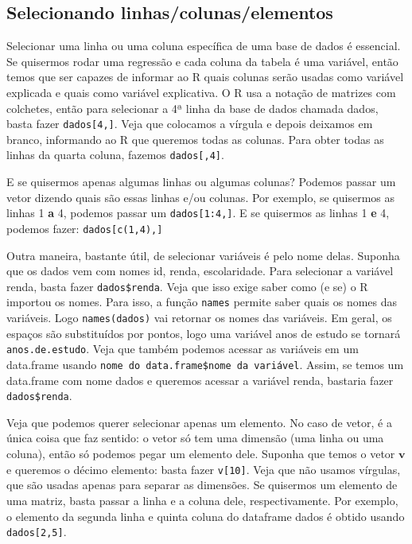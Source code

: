 \documentclass[]{book}
\begin{document}
\subsection{Selecionando
linhas/colunas/elementos}\label{selecionando-linhascolunaselementos}

Selecionar uma linha ou uma coluna específica de uma base de dados é
essencial. Se quisermos rodar uma regressão e cada coluna da tabela é
uma variável, então temos que ser capazes de informar ao R quais colunas
serão usadas como variável explicada e quais como variável explicativa.
O R usa a notação de matrizes com colchetes, então para selecionar a 4ª
linha da base de dados chamada dados, basta fazer
\texttt{dados{[}4,{]}}. Veja que colocamos a vírgula e depois deixamos
em branco, informando ao R que queremos todas as colunas. Para obter
todas as linhas da quarta coluna, fazemos \texttt{dados{[},4{]}}.

E se quisermos apenas algumas linhas ou algumas colunas? Podemos passar
um vetor dizendo quais são essas linhas e/ou colunas. Por exemplo, se
quisermos as linhas 1 \textbf{a} 4, podemos passar um
\texttt{dados{[}1:4,{]}}. E se quisermos as linhas 1 \textbf{e} 4,
podemos fazer: \texttt{dados{[}c(1,4),{]}}

Outra maneira, bastante útil, de selecionar variáveis é pelo nome delas.
Suponha que os dados vem com nomes id, renda, escolaridade. Para
selecionar a variável renda, basta fazer \texttt{dados\$renda}. Veja que
isso exige saber como (e se) o R importou os nomes. Para isso, a função
\texttt{names} permite saber quais os nomes das variáveis. Logo
\texttt{names(dados)} vai retornar os nomes das variáveis. Em geral, os
espaços são substituídos por pontos, logo uma variável anos de estudo se
tornará \texttt{anos.de.estudo}. Veja que também podemos acessar as
variáveis em um data.frame usando
\texttt{nome\ do\ data.frame\$nome\ da\ variável}. Assim, se temos um
data.frame com nome dados e queremos acessar a variável renda, bastaria
fazer \texttt{dados\$renda}.

Veja que podemos querer selecionar apenas um elemento. No caso de vetor,
é a única coisa que faz sentido: o vetor só tem uma dimensão (uma linha
ou uma coluna), então só podemos pegar um elemento dele. Suponha que
temos o vetor \(\mathbf{v}\) e queremos o décimo elemento: basta fazer
\texttt{v{[}10{]}}. Veja que não usamos vírgulas, que são usadas apenas
para separar as dimensões. Se quisermos um elemento de uma matriz, basta
passar a linha e a coluna dele, respectivamente. Por exemplo, o elemento
da segunda linha e quinta coluna do dataframe dados é obtido usando
\texttt{dados{[}2,5{]}}.
\end{document}
